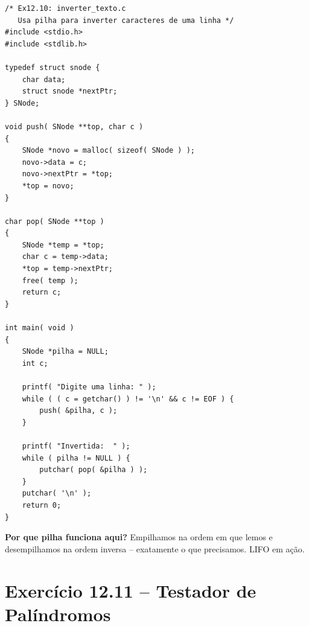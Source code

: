 \documentclass[12pt,a4paper]{article}
\begin{document}
\begin{respostabox}
\begin{lstlisting}
/* Ex12.10: inverter_texto.c
   Usa pilha para inverter caracteres de uma linha */
#include <stdio.h>
#include <stdlib.h>

typedef struct snode {
    char data;
    struct snode *nextPtr;
} SNode;

void push( SNode **top, char c )
{
    SNode *novo = malloc( sizeof( SNode ) );
    novo->data = c;
    novo->nextPtr = *top;
    *top = novo;
}

char pop( SNode **top )
{
    SNode *temp = *top;
    char c = temp->data;
    *top = temp->nextPtr;
    free( temp );
    return c;
}

int main( void )
{
    SNode *pilha = NULL;
    int c;

    printf( "Digite uma linha: " );
    while ( ( c = getchar() ) != '\n' && c != EOF ) {
        push( &pilha, c );
    }

    printf( "Invertida:  " );
    while ( pilha != NULL ) {
        putchar( pop( &pilha ) );
    }
    putchar( '\n' );
    return 0;
}
\end{lstlisting}

\textbf{Por que pilha funciona aqui?} Empilhamos na ordem em que lemos e
desempilhamos na ordem inversa -- exatamente o que precisamos. LIFO em ação.
\end{respostabox}

\section{Exercício 12.11 -- Testador de Palíndromos}
\end{document}
